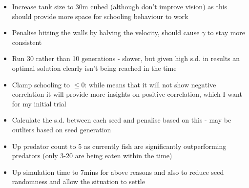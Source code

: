 \begin{itemize}
    \item Increase tank size to 30m cubed (although don't improve vision) as this should provide more space for schooling behaviour to work
    \item Penalise hitting the walls by halving the velocity, should cause $\gamma$ to stay more consistent
    \item Run 30 rather than 10 generations - slower, but given high s.d. in results an optimal solution clearly isn't being reached in the time
    \item Clamp schooling to $\le0$: while means that it will not show negative correlation it will provide more insights on positive correlation, which I want for my initial trial
    \item  Calculate the s.d. between each seed and penalise based on this - may be outliers based on seed generation
    \item Up predator count to 5 as currently fish are significantly outperforming predators (only 3-20 are being eaten within the time)
    \item Up simulation time to 7mins for above reasons and also to reduce seed randomness and allow the situation to settle
\end{itemize}